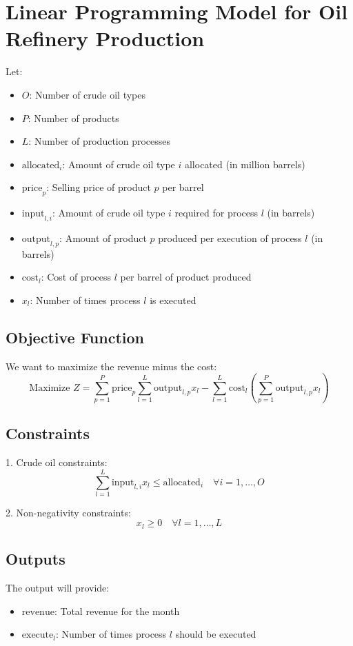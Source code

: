 \documentclass{article}
\begin{document}
\section*{Linear Programming Model for Oil Refinery Production}

Let:
\begin{itemize}
    \item $O$: Number of crude oil types
    \item $P$: Number of products
    \item $L$: Number of production processes
    \item $\text{allocated}_i$: Amount of crude oil type $i$ allocated (in million barrels)
    \item $\text{price}_p$: Selling price of product $p$ per barrel
    \item $\text{input}_{l,i}$: Amount of crude oil type $i$ required for process $l$ (in barrels)
    \item $\text{output}_{l,p}$: Amount of product $p$ produced per execution of process $l$ (in barrels)
    \item $\text{cost}_l$: Cost of process $l$ per barrel of product produced
    \item $x_l$: Number of times process $l$ is executed
\end{itemize}

\subsection*{Objective Function}
We want to maximize the revenue minus the cost:
\[
\text{Maximize } Z = \sum_{p=1}^{P} \text{price}_p \sum_{l=1}^{L} \text{output}_{l,p} x_l - \sum_{l=1}^{L} \text{cost}_l \left( \sum_{p=1}^{P} \text{output}_{l,p} x_l \right)
\]

\subsection*{Constraints}

1. Crude oil constraints:
\[
\sum_{l=1}^{L} \text{input}_{l,i} x_l \leq \text{allocated}_i \quad \forall i = 1, \ldots, O
\]

2. Non-negativity constraints:
\[
x_l \geq 0 \quad \forall l = 1, \ldots, L
\]

\subsection*{Outputs}
The output will provide:
\begin{itemize}
    \item $\text{revenue}$: Total revenue for the month
    \item $\text{execute}_l$: Number of times process $l$ should be executed
\end{itemize}
\end{document}
